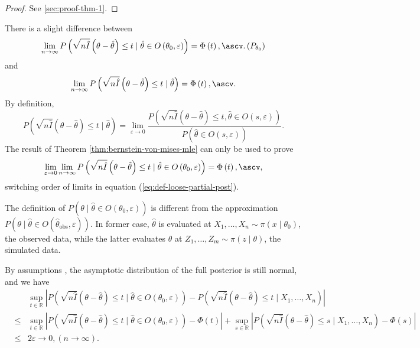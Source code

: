 \begin{proof}
See  \ref{sec:proof-thm-1}.\end{proof}
\begin{rem}
There is a slight difference between 
\[
\lim_{n\rightarrow\infty}P\left(\sqrt{n\hat{I}}\left(\theta-\hat{\theta}\right)\le t\mid\hat{\theta}\in O\left(\theta_{0},\varepsilon\right)\right)=\Phi\left(t\right),\ascv.\left(P_{\theta_{0}}\right)
\]
and 
\[
\lim_{n\rightarrow\infty}P\left(\sqrt{n\hat{I}}\left(\theta-\hat{\theta}\right)\le t\mid\hat{\theta}\right)=\Phi\left(t\right),\ascv.
\]
By definition, 
\begin{equation}
P\left(\sqrt{n\hat{I}}\left(\theta-\hat{\theta}\right)\le t\mid\hat{\theta}\right)=\lim_{\varepsilon\rightarrow0}\frac{P\left(\sqrt{n\hat{I}}\left(\theta-\hat{\theta}\right)\le t,\hat{\theta}\in O\left(s,\varepsilon\right)\right)}{P\left(\hat{\theta}\in O\left(s,\varepsilon\right)\right)}.\label{eq:def-loose-partial-post}
\end{equation}
The result of Theorem \ref{thm:bernstein-von-mises-mle} can only
be used to prove 
\[
\lim_{\varepsilon\rightarrow0}\lim_{n\rightarrow\infty}P\left(\sqrt{n\hat{I}}\left(\theta-\hat{\theta}\right)\le t\mid\hat{\theta}\in O\left(\theta_{0},\varepsilon\right)\right)=\Phi\left(t\right),\ascv,
\]
switching order of limits in equation (\ref{eq:def-loose-partial-post}). 
\begin{rem}
The definition of $P\left(\theta\mid\hat{\theta}\in O\left(\theta_{0},\varepsilon\right)\right)$
is different from the approximation $P\left(\theta\mid\hat{\theta}\in O\left(\hat{\theta}_{\mathrm{obs}},\varepsilon\right)\right)$.
In former case, $\hat{\theta}$ is evaluated at $X_{1},\ldots,X_{n}\sim\pi\left(x\mid\theta_{0}\right)$,
the observed data, while the latter evaluates $\hat{\theta}$ at $Z_{1},\ldots,Z_{m}\sim\pi\left(z\mid\theta\right)$,
the simulated data. 
\end{rem}
\end{rem}
By {assumptions }, the asymptotic
distribution of the full posterior is still normal, and we have 
\begin{eqnarray*}
 &  & \sup_{t\in\mathbb{R}}\left|P\left(\sqrt{n\hat{I}}\left(\theta-\hat{\theta}\right)\le t\mid\hat{\theta}\in O\left(\theta_{0},\varepsilon\right)\right)-P\left(\sqrt{n\hat{I}}\left(\theta-\hat{\theta}\right)\le t\mid X_{1},\ldots,X_{n}\right)\right|\\
 & \le & \sup_{t\in\mathbb{R}}\left|P\left(\sqrt{n\hat{I}}\left(\theta-\hat{\theta}\right)\le t\mid\hat{\theta}\in O\left(\theta_{0},\varepsilon\right)\right)-\Phi\left(t\right)\right|+\sup_{s\in\mathbb{R}}\left|P\left(\sqrt{n\hat{I}}\left(\theta-\hat{\theta}\right)\le s\mid X_{1},\ldots,X_{n}\right)-\Phi\left(s\right)\right|\\
 & \le & 2\varepsilon\rightarrow0,\left(n\rightarrow\infty\right).
\end{eqnarray*}
